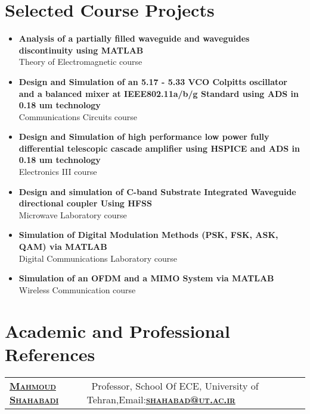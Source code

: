 \documentclass[a4paper,10pt]{article} %
\begin{document}
\begin{itemize}
\color{blue}
\section{Selected Course Projects}
\color{Black}
\begin{itemize}
	\item
	\textbf{Analysis of a partially filled waveguide and waveguides discontinuity using MATLAB}\\
	 Theory of Electromagnetic course
\item
	\textbf{Design and Simulation of an 5.17 - 5.33 VCO Colpitts oscillator and a balanced mixer at IEEE802.11a/b/g Standard using  ADS  in 0.18 um technology  }\\
	Communications Circuits course
	\item
	\textbf{Design and Simulation of high performance low power fully differential telescopic cascade amplifier using HSPICE and ADS  in 0.18 um technology   }\\
	Electronics III course
	\item
	\textbf{Design and simulation of C-band Substrate Integrated Waveguide directional coupler Using HFSS  }\\
	Microwave Laboratory course
		\item
		\textbf{Simulation of Digital Modulation Methods (PSK, FSK, ASK, QAM) via MATLAB}\\
		Digital Communications Laboratory course
		\item
		\textbf{Simulation of an OFDM and a MIMO System via MATLAB}\\
		Wireless Communication course
	\end{itemize}
\color{blue}
\section{Academic and Professional References}
\color{Black}
\begin{tabular}{ll}
		
		
		\textsc{\href{http://ece.ut.ac.ir/en/users/shahabadi}{\bf{Mahmoud Shahabadi}}}&    \  Professor, School Of ECE, University of Tehran,Email:\textsc{\href{mailto:Shahabad@ut.ac.ir}{\bf{shahabad@ut.ac.ir}}}\\
		

\end{tabular}
\end{itemize}
\end{document}
